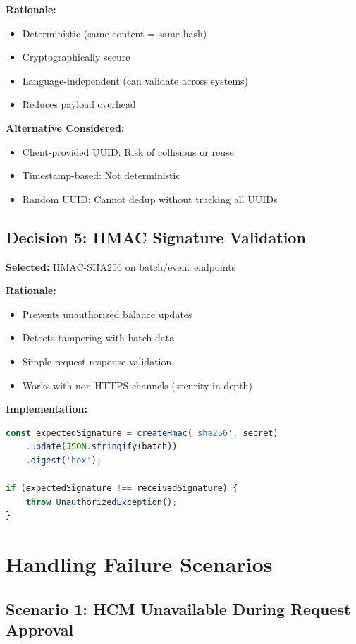 \documentclass[12pt,a4paper]{article}
\begin{document}
\textbf{Rationale:}
\begin{itemize}
    \item Deterministic (same content = same hash)
    \item Cryptographically secure
    \item Language-independent (can validate across systems)
    \item Reduces payload overhead
\end{itemize}

\textbf{Alternative Considered:}
\begin{itemize}
    \item Client-provided UUID: Risk of collisions or reuse
    \item Timestamp-based: Not deterministic
    \item Random UUID: Cannot dedup without tracking all UUIDs
\end{itemize}

\subsection{Decision 5: HMAC Signature Validation}

\textbf{Selected:} HMAC-SHA256 on batch/event endpoints

\textbf{Rationale:}
\begin{itemize}
    \item Prevents unauthorized balance updates
    \item Detects tampering with batch data
    \item Simple request-response validation
    \item Works with non-HTTPS channels (security in depth)
\end{itemize}

\textbf{Implementation:}
\begin{lstlisting}[language=TypeScript]
const expectedSignature = createHmac('sha256', secret)
    .update(JSON.stringify(batch))
    .digest('hex');
    
if (expectedSignature !== receivedSignature) {
    throw UnauthorizedException();
}
\end{lstlisting}

\newpage

\section{Handling Failure Scenarios}

\subsection{Scenario 1: HCM Unavailable During Request Approval}
\end{document}
